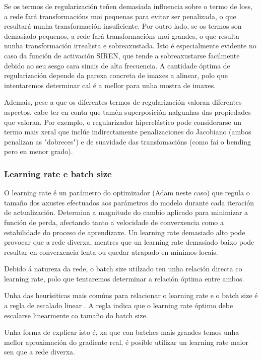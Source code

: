 Se os termos de regularización teñen demasiada influencia sobre o termo de loss, a rede fará transformacións moi pequenas para evitar ser penalizada, o que resultará nunha transformación insuficiente.
Por outro lado, se os termos son demasiado pequenos, a rede fará transformacións moi grandes, o que resulta nunha transformación irrealista e sobreaxustada. Isto é especialmente evidente no caso da función de activación SIREN, que tende a sobreaxustarse facilmente debido ao seu sesgo cara sinais de alta frecuencia.
A cantidade óptima de regularización depende da parexa concreta de imaxes a alinear, polo que intentaremos determinar cal é a mellor para unha mostra de imaxes.

Ademais, pese a que os diferentes termos de regularización valoran diferentes aspectos, cabe ter en conta que tamén superposición nalgunhas das propiedades que valoran.
Por exemplo, o regularizador hiperelástico pode considerarse un termo mais xeral que inclúe indirectamente penalizaciones do Jacobiano (ambos penalizan as "dobreces") e de suavidade das transfomacións (como fai o bending pero en menor grado).

\subsubsection{Learning rate e batch size}
\label{subsubsec:Learning rate e batch size}

O learning rate é un parámetro do optimizador (Adam neste caso) que regula o tamaño dos axustes efectuados aos parámetros do modelo durante cada iteración de actualización. 
Determina a magnitude do cambio aplicado para minimizar a función de perda, afectando tanto a velocidade de converxencia como a estabilidade do proceso de aprendizaxe.
Un learning rate demasiado alto pode provocar que a rede diverxa, mentres que un learning rate demasiado baixo pode resultar en converxencia lenta ou quedar atrapado en mínimos locais.

Debido á natureza da rede, o batch size utilzado ten unha relación directa co learning rate, polo que tentaremos determinar a relación óptima entre ambos.

Unha das heurísiticas mais comúns para relacionar o learning rate e o batch size é a regla de escalado linear \cite{goyal2018accuratelargeminibatchsgd}. 
A regla indica que o learning rate óptimo debe escalarse linearmente co tamaño do batch size. 

Unha forma de explicar isto é, xa que con batches mais grandes temos unha mellor aproximación do gradiente real, é posible utilizar un learning rate maior sen que a rede diverxa. \cite{kexuefm}

